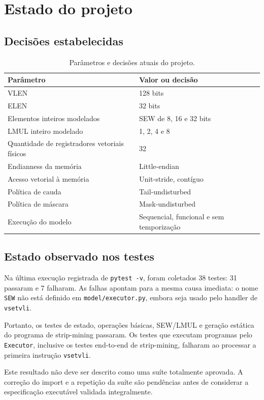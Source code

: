 \section{Estado do projeto}

\subsection{Decisões estabelecidas}

\begin{table}[ht]
\centering
\begin{tabular}{ll}
\toprule
\textbf{Parâmetro} & \textbf{Valor ou decisão} \\
\midrule
VLEN & 128 bits \\
ELEN & 32 bits \\
Elementos inteiros modelados & SEW de 8, 16 e 32 bits \\
LMUL inteiro modelado & 1, 2, 4 e 8 \\
Quantidade de registradores vetoriais físicos & 32 \\
Endianness da memória & Little-endian \\
Acesso vetorial à memória & Unit-stride, contíguo \\
Política de cauda & Tail-undisturbed \\
Política de máscara & Mask-undisturbed \\
Execução do modelo & Sequencial, funcional e sem temporização \\
\bottomrule
\end{tabular}
\caption{Parâmetros e decisões atuais do projeto.}
\end{table}

\subsection{Estado observado nos testes}

Na última execução registrada de \texttt{pytest -v}, foram coletados
38 testes: 31 passaram e 7 falharam. As falhas apontam para a mesma
causa imediata: o nome \texttt{SEW} não está definido em
\texttt{model/executor.py}, embora seja usado pelo handler de
\texttt{vsetvli}.

Portanto, os testes de estado, operações básicas, SEW/LMUL e geração
estática do programa de strip-mining passaram. Os testes que executam
programas pelo \texttt{Executor}, inclusive os testes end-to-end de
strip-mining, falharam ao processar a primeira instrução
\texttt{vsetvli}.

Este resultado não deve ser descrito como uma suíte totalmente aprovada.
A correção do import e a repetição da suíte são pendências antes de
considerar a especificação executável validada integralmente.